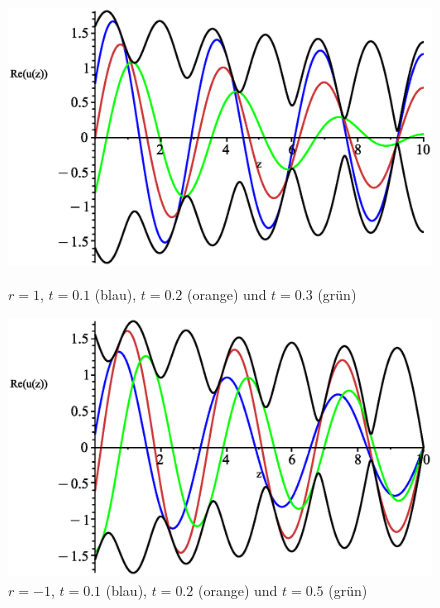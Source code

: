 \documentclass[paper=a4, parskip=half-, ngerman, fontsize=11pt]{scrreprt}
\begin{document}
\begin{figure}[!htpb]
    \vspace{1ex}

    \begin{minipage}{0.45\textwidth}
        \centering
        \includegraphics[width=\linewidth]{../graphics/Enveloppe/verlustbehaftet/R1}
        \caption*{$r=1$, $t=0.1$ (blau), $t=0.2$ (orange) und $t=0.3$ (grün)}
    \end{minipage}\hfill
    \begin{minipage}{0.45\textwidth}
        \centering
        \includegraphics[width=\linewidth]{../graphics/Enveloppe/verlustbehaftet/R-1}
        \caption*{$r=-1$, $t=0.1$ (blau), $t=0.2$ (orange) und $t=0.5$ (grün)}
    \end{minipage}

    \label{WellenausbreitungVerlustbehaftet}

\end{figure}


\printbibliography
\end{document}
